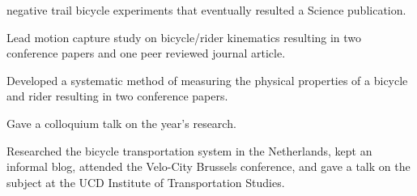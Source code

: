 \documentclass[10pt]{article}
\newenvironment{outerlist}[1][\enskip\textbullet]%
        {\begin{itemize}[#1]}{\end{itemize}%
         \vspace{-.6\baselineskip}}
\newenvironment{innerlist}[1][\enskip\textbullet]%
        {\begin{compactitem}[#1]}{\end{compactitem}}
\newcommand{\blankline}{\quad\pagebreak[2]}
\begin{document}
\begin{outerlist}
\begin{innerlist}
{        negative trail bicycle experiments} that eventually resulted a Science
        publication.
    \item Lead motion capture study on bicycle/rider kinematics resulting in
        two conference papers and one peer reviewed journal article.
    \item Developed a systematic method of measuring the physical properties of
        a bicycle and rider resulting in two conference papers.
    \item Gave a colloquium talk on the year's research.
    \item Researched the bicycle transportation system in the Netherlands, kept
        an informal blog, attended the Velo-City Brussels conference, and gave
        a talk on the subject at the UCD Institute of Transportation Studies.
  \end{innerlist}
\end{outerlist}


\blankline
\end{document}
